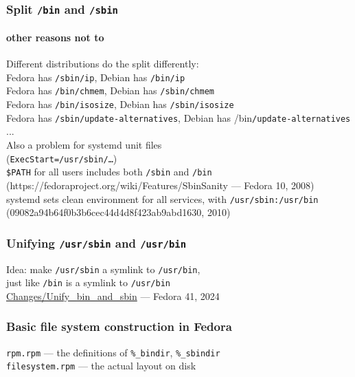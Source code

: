 \documentclass[]{beamer}
\begin{document}
\begin{frame}
  \frametitle{Split \texttt{/bin} and \texttt{/sbin}}
  \framesubtitle{other reasons not to}

  \pause
  Different distributions do the split differently:\\
  {\tiny
  Fedora has \texttt{/sbin/ip}, Debian has \texttt{/bin/ip}\\
  Fedora has \texttt{/bin/chmem}, Debian has \texttt{/sbin/chmem}\\
  Fedora has \texttt{/bin/isosize}, Debian has \texttt{/sbin/isosize}\\
  Fedora has \texttt{/sbin/update-alternatives}, Debian has /bin\texttt{/update-alternatives}\\
  ...
  }
  \\

  \pause
  Also a problem for systemd unit files\\
  (\texttt{\small ExecStart=/usr/sbin/…})
  \\

  \pause
  \texttt{\$PATH} for all users includes both \texttt{/sbin} and \texttt{/bin}\\
  {\small (https://fedoraproject.org/wiki/Features/SbinSanity
  — Fedora 10, 2008)}
  \\

  \pause
  systemd sets clean environment for all services, with \texttt{/usr/sbin:/usr/bin}
  \small (09082a94b64f0b3b6cec44d4d8f423ab9abd1630, 2010)
\end{frame}

\begin{frame}
  \frametitle{Unifying \texttt{/usr/sbin} and \texttt{/usr/bin}}

  \pause
  Idea: make \texttt{/usr/sbin} a symlink to \texttt{/usr/bin},\\
  just like \texttt{/bin} is a symlink to \texttt{/usr/bin}\\

  \href{https://fedoraproject.org/wiki/Changes/Unify_bin_and_sbin}{Changes/Unify\_bin\_and\_sbin}
  — Fedora 41, 2024
\end{frame}

\begin{frame}
  \frametitle{Basic file system construction in Fedora}

  \pause
  \texttt{rpm.rpm} — the definitions of \texttt{\%\_bindir}, \texttt{\%\_sbindir}
  \\

  \pause
  \texttt{filesystem.rpm} — the actual layout on disk
  \\
\end{frame}
\end{document}
